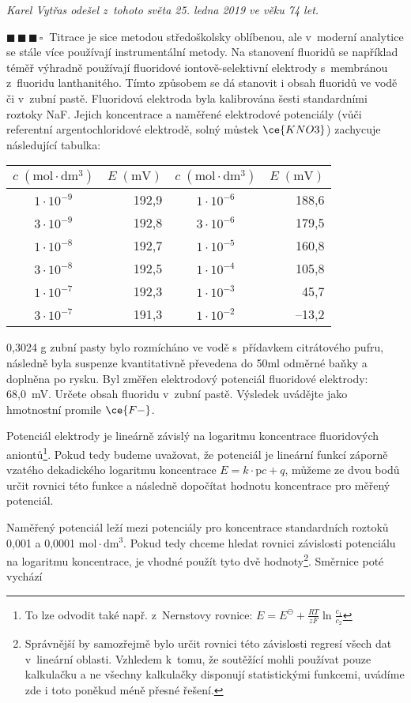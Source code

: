 \documentclass{book}
\newcommand{\tri}{$\blacksquare \, \blacksquare \, \blacksquare \, \square \; \; $}
\renewenvironment{quotation}{\par}{\par} %
\begin{document}
\textit{Karel Vytřas odešel z~tohoto světa 25. ledna 2019 ve věku
74 let.}
\begin{quotation}
\tri Titrace je sice metodou středoškolsky oblíbenou, ale v~moderní analytice
se stále více používají instrumentální metody. Na stanovení fluoridů
se například téměř výhradně používají fluoridové iontově-selektivní
elektrody s~membránou z~fluoridu lanthanitého. Tímto způsobem se dá
stanovit i obsah fluoridů ve vodě či v~zubní pastě. Fluoridová elektroda
byla kalibrována šesti standardními roztoky NaF. Jejich koncentrace
a naměřené elektrodové potenciály (vůči referentní argentochloridové
elektrodě, solný můstek $\ce{KNO3}$) zachycuje následující tabulka: 
\begin{center}
\begin{tabular}{c|r||c|r} 
$c\;(\mathrm{mol \cdot dm^{3}})$ & $E\;(\mathrm{mV})$ & $c\;(\mathrm{mol \cdot dm^{3}})$ & $E\;(\mathrm{mV})$\tabularnewline
\hline 
\hline 
$1\cdot10^{-9}$ & 192,9 & $1\cdot10^{-6}$ & 188,6\tabularnewline
\hline 
$3\cdot10^{-9}$ & 192,8 & $3\cdot10^{-6}$ & 179,5\tabularnewline
\hline 
$1\cdot10^{-8}$ & 192,7 & $1\cdot10^{-5}$ & 160,8\tabularnewline
\hline 
$3\cdot10^{-8}$ & 192,5 & $1\cdot10^{-4}$ & 105,8\tabularnewline
\hline 
$1\cdot10^{-7}$ & 192,3 & $1\cdot10^{-3}$ & 45,7\tabularnewline
\hline 
$3\cdot10^{-7}$ & 191,3 & $1\cdot10^{-2}$ & --13,2\tabularnewline

\end{tabular}
\end{center}
0,3024 g zubní pasty bylo rozmícháno ve vodě s~přídavkem citrátového
pufru, následně byla suspenze kvantitativně převedena do 50ml odměrné
baňky a doplněna po rysku. Byl změřen elektrodový potenciál
fluoridové elektrody: 68,0~mV. Určete obsah fluoridu v~zubní pastě.
Výsledek uvádějte jako hmotnostní promile $\ce{F-}$.
\end{quotation} \dotfill \par 
Potenciál elektrody je lineárně závislý na logaritmu koncentrace fluoridových
aniontů\footnote{To lze odvodit také např. z~Nernstovy rovnice: $E=E^{\ominus}+\frac{RT}{zF}\ln\frac{c_{1}}{c_{2}}$}.
Pokud tedy budeme uvažovat, že potenciál je lineární funkcí záporně
vzatého dekadického logaritmu koncentrace $E=k\cdot\mathrm{p}c+q$,
můžeme ze dvou bodů určit rovnici této funkce a následně dopočítat
hodnotu koncentrace pro měřený potenciál.

Naměřený potenciál leží mezi potenciály pro koncentrace standardních
roztoků 0,001 a 0,0001 $\mathrm{mol \cdot dm^{3}}$. Pokud tedy chceme hledat
rovnici závislosti potenciálu na logaritmu koncentrace, je vhodné
použít tyto dvě hodnoty\footnote{Správnější by samozřejmě bylo určit rovnici této závislosti regresí všech dat v~lineární oblasti. Vzhledem k~tomu, že soutěžící mohli používat pouze kalkulačku a ne všechny kalkulačky disponují statistickými funkcemi, uvádíme zde i toto poněkud méně přesné řešení.}. Směrnice poté vychází
\end{document}
